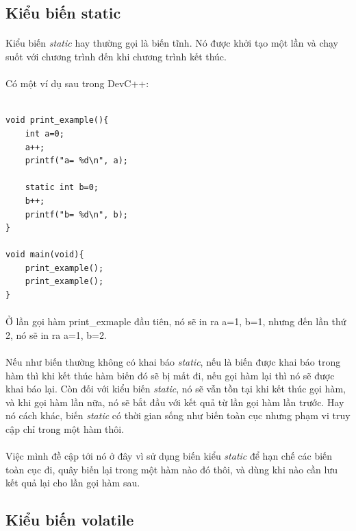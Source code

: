 \documentclass[12pt,a5paper]{book}
\begin{document}
\subsection{Kiểu biến static}
\paragraph{}
Kiểu biến \textit{static} hay thường gọi là biến tĩnh. Nó được khởi tạo một lần và chạy suốt với chương trình đến khi chương trình kết thúc.
\paragraph{}
Có một ví dụ sau trong DevC++:
\begin{lstlisting}

void print_example(){
	int a=0;
	a++;
	printf("a= %d\n", a);
	
	static int b=0;
	b++;
	printf("b= %d\n", b);
}

void main(void){
	print_example();
	print_example();
}

\end{lstlisting}
\paragraph{}
Ở lần gọi hàm print\_exmaple đầu tiên, nó sẽ in ra a=1, b=1, nhưng đến lần thứ 2, nó sẽ in ra a=1, b=2. 
\paragraph{}
Nếu như biến thường không có khai báo \textit{static}, nếu là biến được khai báo trong hàm thì khi kết thúc hàm biến đó sẽ bị mất đi, nếu gọi hàm lại thì nó sẽ được khai báo lại. Còn đối với kiểu biến
\textit{static}, nó sẽ vẫn tồn tại khi kết thúc gọi hàm, và khi gọi hàm lần nữa, nó sẽ bắt đầu với kết quả từ lần gọi hàm lần trước. Hay nó cách khác, biến \textit{static} có thời gian sống như biến toàn cục nhưng phạm vi truy cập chỉ trong một hàm thôi. 
\paragraph{}
Việc mình đề cập tới nó ở đây vì sử dụng biến kiểu \textit{static} để hạn chế các biến toàn cục đi, quây biến lại trong một hàm nào đó thôi, và dùng khi nào cần lưu kết quả lại cho lần gọi hàm sau.
\subsection{Kiểu biến volatile}
\end{document}
